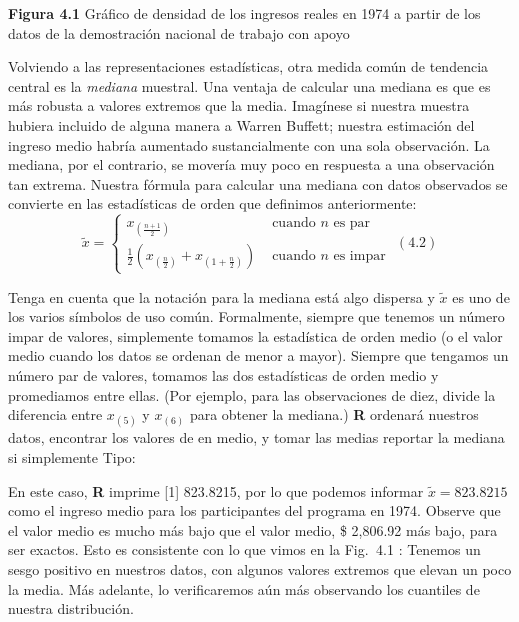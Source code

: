 \documentclass[
]{book}
\newenvironment{Shaded}{\begin{snugshade}}{\end{snugshade}}
\newcommand{\FunctionTok}[1]{\textcolor[rgb]{0.00,0.00,0.00}{#1}}
\newcommand{\NormalTok}[1]{#1}
\newcommand{\SpecialCharTok}[1]{\textcolor[rgb]{0.00,0.00,0.00}{#1}}
\begin{document}
\textbf{Figura 4.1} Gráfico de densidad de los ingresos reales en 1974 a partir de los datos de la demostración nacional de trabajo con apoyo

Volviendo a las representaciones estadísticas, otra medida común de tendencia central es la \emph{mediana} muestral. Una ventaja de calcular una mediana es que es más robusta a valores extremos que la media. Imagínese si nuestra muestra hubiera incluido de alguna manera a Warren Buffett; nuestra estimación del ingreso medio habría aumentado sustancialmente con una sola observación. La mediana, por el contrario, se movería muy poco en respuesta a una observación tan extrema. Nuestra fórmula para calcular una mediana con datos observados se convierte en las estadísticas de orden que definimos anteriormente:
\[
\tilde{x}= \begin{cases}x_{\left(\frac{n+1}{2}\right)} & \text { cuando } n \text { es par } \\ \frac{1}{2}\left(x_{\left(\frac{n}{2}\right)}+x_{\left(1+\frac{n}{2}\right)}\right) & \text { cuando } n \text { es impar }\end{cases}
(4.2)
\]

Tenga en cuenta que la notación para la mediana está algo dispersa y \(\tilde{x}\) es uno de los varios símbolos de uso común. Formalmente, siempre que tenemos un número impar de valores, simplemente tomamos la estadística de orden medio (o el valor medio cuando los datos se ordenan de menor a mayor). Siempre que tengamos un número par de valores, tomamos las dos estadísticas de orden medio y promediamos entre ellas. (Por ejemplo, para las observaciones de diez, divide la diferencia entre \(x_{(5)}\) y \(x_{(6)}\) para obtener la mediana.) \textbf{R} ordenará nuestros datos, encontrar los valores de en medio, y tomar las medias reportar la mediana si simplemente Tipo:

\begin{Shaded}
\end{Shaded}

En este caso, \textbf{R} imprime {[}1{]} 823.8215, por lo que podemos informar \(\tilde{x}=823.8215\) como el ingreso medio para los participantes del programa en 1974. Observe que el valor medio es mucho más bajo que el valor medio, \$ 2,806.92 más bajo, para ser exactos. Esto es consistente con lo que vimos en la Fig.  4.1 : Tenemos un sesgo positivo en nuestros datos, con algunos valores extremos que elevan un poco la media. Más adelante, lo verificaremos aún más observando los cuantiles de nuestra distribución.
\end{document}
